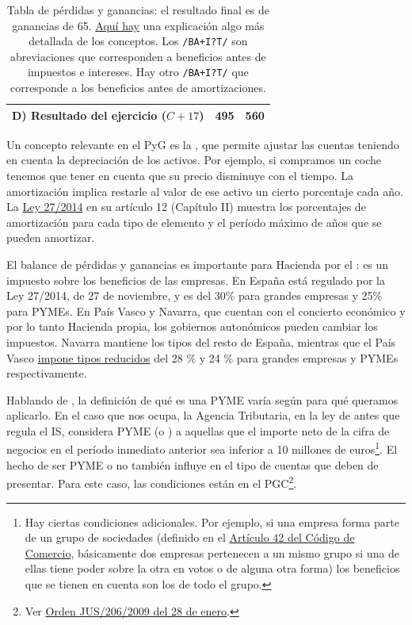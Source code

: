 \documentclass[nochap,palatino,notitlepage]{apuntes}
\begin{document}
\begin{table}[hbtp]
\begin{minipage}{\textwidth}
\begin{tabular}{l|c|c}
\textbf{D) Resultado del ejercicio} ($C + 17$) & \textbf{495} & \textbf{560} \\ \bottomrule
\end{tabular}
\caption{Tabla de pérdidas y ganancias: el resultado final es de ganancias de 65. \href{http://www.plangeneralcontable.com/?tit=guia-del-pgc-de-pymes&name=GeTia&contentId=man_pgcpym&manPage=26}{Aquí hay} una explicación algo más detallada de los conceptos. Los \texttt{/BA+I?T/} son abreviaciones que corresponden a beneficios antes de impuestos e intereses. Hay otro \texttt{/BA+I?T/} que corresponde a los beneficios antes de amortizaciones.}
\label{tab:PyG}
\end{minipage}
\end{table}

Un concepto relevante en el PyG es la , que permite ajustar las cuentas teniendo en cuenta la depreciación de los activos. Por ejemplo, si compramos un coche tenemos que tener en cuenta que su precio disminuye con el tiempo. La amortización implica restarle al valor de ese activo un cierto porcentaje cada año. La \href{http://www.boe.es/diario_boe/txt.php?id=BOE-A-2014-12328}{Ley 27/2014} en su artículo 12 (Capítulo II) muestra los porcentajes de amortización para cada tipo de elemento y el período máximo de años que se pueden amortizar.

El balance de pérdidas y ganancias es importante para Hacienda por el : es un impuesto sobre los beneficios de las empresas. En España está regulado por la Ley 27/2014, de 27 de noviembre, y es del 30\% para grandes empresas y 25\% para PYMEs. En País Vasco y Navarra, que cuentan con el concierto económico y por lo tanto Hacienda propia, los gobiernos autonómicos pueden cambiar los impuestos. Navarra mantiene los tipos del resto de España, mientras que el País Vasco \href{http://www.ogasun.ejgv.euskadi.eus/r51-341/es/contenidos/informacion/6901/es_2316/es_12215.html}{impone tipos reducidos} del 28 \% y 24 \% para grandes empresas y PYMEs respectivamente.

Hablando de , la definición de qué es una PYME varía según para qué queramos aplicarlo. En el caso que nos ocupa, la Agencia Tributaria, en la ley de antes que regula el IS, considera PYME (o ) a aquellas que el importe neto de la cifra de negocios en el período inmediato anterior sea inferior a 10 millones de euros\footnote{Hay ciertas condiciones adicionales. Por ejemplo, si una empresa forma parte de un grupo de sociedades (definido en el \href{https://www.boe.es/buscar/act.php?id=BOE-A-1885-6627&tn=1&vd=&p=20150721}{Artículo 42 del Código de Comercio}, básicamente dos empresas pertenecen a un mismo grupo si una de ellas tiene poder sobre la otra en votos o de alguna otra forma) los beneficios que se tienen en cuenta son los de todo el grupo.}. El hecho de ser PYME o no también influye en el tipo de cuentas que deben de presentar. Para este caso, las condiciones están en el PGC\footnote{Ver \href{https://www.boe.es/boe/dias/2009/02/10/pdfs/BOE-A-2009-2276.pdf}{Orden JUS/206/2009 del 28 de enero}.}.
\end{document}
